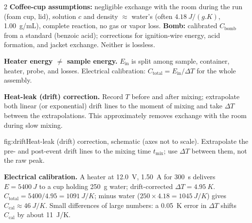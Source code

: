 \begin{multicols}{2}
\textbf{Coffee-cup assumptions:} negligible exchange with the room during the run (foam cup, lid), solution $c$ and density $\approx$ water's (often $\SI{4.18}{J/(g.K)}$, \SI{1.00}{g/mL}), complete reaction, no gas or vapor loss. \textbf{Bomb:} calibrated $C_{\text{bomb}}$ from a standard (benzoic acid); corrections for ignition-wire energy, acid formation, and jacket exchange. Neither is lossless.

\textbf{Heater energy $\ne$ sample energy.} $E_{\text{in}}$ is split among sample, container, heater, probe, and losses. Electrical calibration: $C_{\text{total}}=E_{\text{in}}/\Delta T$ for the whole assembly.

\textbf{Heat-leak (drift) correction.} Record $T$ before and after mixing; extrapolate both linear (or exponential) drift lines to the moment of mixing and take $\Delta T$ between the extrapolations. This approximately removes exchange with the room during slow mixing.

\begin{reffig}{fig:drift}{Heat-leak (drift) correction, schematic (axes not to scale). Extrapolate the pre- and post-event drift lines to the mixing time $t_{\text{mix}}$; use $\Delta T$ between them, not the raw peak.}
\end{reffig}

\begin{demobox}\textbf{Electrical calibration.} A heater at \SI{12.0}{V}, \SI{1.50}{A} for \SI{300}{s} delivers $E=\SI{5400}{J}$ to a cup holding \SI{250}{g} water; drift-corrected $\Delta T=\SI{4.95}{K}$. $C_{\text{total}}=5400/4.95=\SI{1091}{J/K}$; minus water ($250\times4.18=\SI{1045}{J/K}$) gives $C_{\text{cal}}\approx\SI{46}{J/K}$. Small differences of large numbers: a \SI{0.05}{K} error in $\Delta T$ shifts $C_{\text{cal}}$ by about \SI{11}{J/K}.\end{demobox}


\end{multicols}
